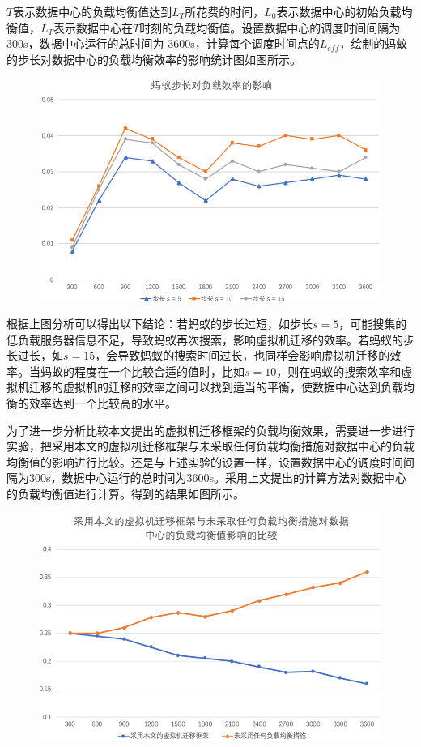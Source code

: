 $ T $表示数据中心的负载均衡值达到$ L_T $所花费的时间，$ L_0 $表示数据中心的初始负载均衡值，$ L_T $表示数据中心在$ T $时刻的负载均衡值。设置数据中心的调度时间间隔为 300s，数据中心运行的总时间为 3600s，计算每个调度时间点的$ L_{eff} $，绘制的蚂蚁的步长对数据中心的负载均衡效率的影响统计图如图所示。

\begin{figure}[htb]
  \centering
  \includegraphics{./Figure/IMG_Chap4_7.png}
\end{figure}

根据上图分析可以得出以下结论：若蚂蚁的步长过短，如步长$ s = 5 $，可能搜集的低负载服务器信息不足，导致蚂蚁再次搜索，影响虚拟机迁移的效率。若蚂蚁的步长过长，如$ s = 15 $，会导致蚂蚁的搜索时间过长，也同样会影响虚拟机迁移的效率。当蚂蚁的程度在一个比较合适的值时，比如$ s = 10 $，则在蚂蚁的搜索效率和虚拟机迁移的虚拟机的迁移的效率之间可以找到适当的平衡，使数据中心达到负载均衡的效率达到一个比较高的水平。

为了进一步分析比较本文提出的虚拟机迁移框架的负载均衡效果，需要进一步进行实验，把采用本文的虚拟机迁移框架与未采取任何负载均衡措施对数据中心的负载均衡值的影响进行比较。还是与上述实验的设置一样，设置数据中心的调度时间间隔为300s，数据中心运行的总时间为3600s。采用上文提出的计算方法对数据中心的负载均衡值进行计算。得到的结果如图所示。

\begin{figure}[htb]
  \centering
  \includegraphics{./Figure/IMG_Chap4_8.png}
\end{figure}

